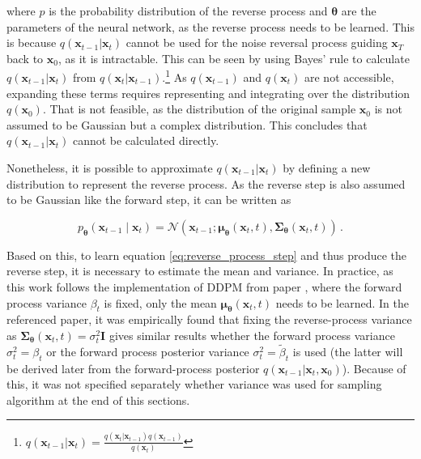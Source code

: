where $p$ is the probability distribution of the reverse process and $\boldsymbol{\theta}$ are the parameters of the neural network, as the reverse process needs to be learned. This is because $q(\mathbf{x}_{t-1}|\mathbf{x}_t)$ cannot be used for the noise reversal process guiding $\mathbf{x}_T$ back to $\mathbf{x}_0$, as it is intractable. This can be seen by using Bayes' rule to calculate $q(\mathbf{x}_{t-1}|\mathbf{x}_t)$ from $q(\mathbf{x}_t|\mathbf{x}_{t-1})$.\footnote{$q(\mathbf{x}_{t-1}|\mathbf{x}_t) = \frac{q(\mathbf{x}_t|\mathbf{x}_{t-1})q(\mathbf{x}_{t-1})}{q(\mathbf{x}_t)}$} As $q(\mathbf{x}_{t-1})$ and $q(\mathbf{x}_t)$ are not accessible, expanding these terms requires representing and integrating over the distribution $q(\mathbf{x}_0)$. That is not feasible, as the distribution of the original sample $\mathbf{x}_0$ is not assumed to be Gaussian but a complex distribution. This concludes that $q(\mathbf{x}_{t-1}|\mathbf{x}_t)$ cannot be calculated directly. \cite{strümke2023lecturenotesprobabilisticdiffusion}

Nonetheless, it is possible to approximate $q(\mathbf{x}_{t-1}|\mathbf{x}_t)$ by defining a new distribution to represent the reverse process. As the reverse step is also assumed to be Gaussian like the forward step, it can be written as

\begin{equation}
    p_{\boldsymbol{\theta}}\left(\mathbf{x}_{t-1} \mid \mathbf{x}_t\right)=\mathcal{N}\left(\mathbf{x}_{t-1} ; \boldsymbol{\mu}_{\boldsymbol{\theta}}\left(\mathbf{x}_t, t\right), \boldsymbol{\Sigma}_{\boldsymbol{\theta}}\left(\mathbf{x}_t, t\right)\right) \,. 
    \label{eq:reverse_process_step}
\end{equation}

Based on this, to learn equation \ref{eq:reverse_process_step} and thus produce the reverse step, it is necessary to estimate the mean and variance. In practice, as this work follows the implementation of DDPM from paper \cite{ho2020denoisingdiffusionprobabilisticmodels}, where the forward process variance $\beta_t$ is fixed, only the mean $\boldsymbol{\mu}_{\boldsymbol{\theta}}\left(\mathbf{x}_t, t\right)$ needs to be learned. In the referenced paper, it was empirically found that fixing the reverse-process variance as $\boldsymbol{\Sigma}_{\boldsymbol{\theta}}\left(\mathbf{x}_t, t\right) = \sigma_t^2 \mathbf{I}$ gives similar results whether the forward process variance $\sigma_t^2=\beta_t$ or the forward process posterior variance $\sigma_t^2=\tilde{\beta}_t$ is used (the latter will be derived later from the forward-process posterior $q(\mathbf{x}_{t-1}|\mathbf{x}_t,\mathbf{x}_0)$). Because of this, it was not specified separately whether variance was used for sampling algorithm at the end of this sections.

